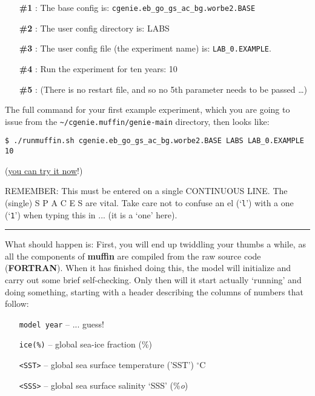 \documentclass[11pt,fleqn]{book} %
\begin{document}
\vspace{2mm}
\begin{enumerate}[noitemsep]
\setlength{\itemindent}{.2in}
\item[\textbf{\#1}]: The base config is: \texttt{cgenie.eb\_go\_gs\_ac\_bg.worbe2.BASE}
\item[\textbf{\#2}]: The user config directory is: LABS
\item[\textbf{\#3}]: The user config file (the experiment name) is: \texttt{LAB\_0.EXAMPLE}.
\item[\textbf{\#4}]: Run the experiment for ten years: 10
\item[\textbf{\#5}]: (There is no restart file, and so no 5th parameter needs to be passed …)
\end{enumerate}

The full command for your first example experiment, which you are going to issue from the \texttt{\~}\texttt{/cgenie.muffin/genie-main} directory, then looks like:

\vspace{-1mm}
\begin{verbatim}
$ ./runmuffin.sh cgenie.eb_go_gs_ac_bg.worbe2.BASE LABS LAB_0.EXAMPLE 10
\end{verbatim}
\vspace{-1mm}

\noindent(\uline{you can try it now}!)

\vspace{2mm}
REMEMBER: This must be entered on a single CONTINUOUS LINE. The (single) S P A C E S are vital. Take care not to confuse an el (‘\texttt{l}’) with a one (‘\texttt{1}’) when typing this in ... (it is a ‘one’ here).

\vspace{1mm}
\noindent\rule{4cm}{0.1mm}
\vspace{2mm}

\noindent What should happen is: First, you will end up twiddling your thumbs a while, as all the components of \textbf{muffin} are compiled from the raw source code (\textbf{FORTRAN}). When it has finished doing this, the model will initialize and carry out some brief self-checking. Only then will it start actually ‘running’ and doing something, starting with a header describing the columns of numbers that follow:

\begin{itemize}
\item[] \texttt{model year}  -- ... guess!
\item[] \texttt{ice(\%)} -- global sea-ice fraction (\%)
\item[] \texttt{<SST>} -- global sea surface temperature ('SST') $^{\circ}$C
\item[] \texttt{<SSS>} -- global sea surface salinity ‘SSS’ (\%\textit{o})
\end{itemize}
\end{document}
